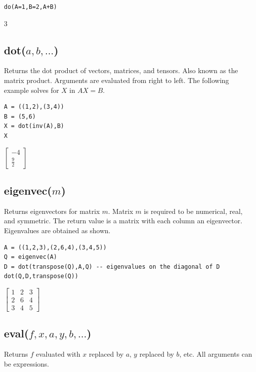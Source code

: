 \documentclass[12pt]{article}
\begin{document}
{\color{blue}
\begin{verbatim}
do(A=1,B=2,A+B)
\end{verbatim}
}

\noindent
$3$

\subsection*{dot($a,b,\ldots$)}

Returns the dot product of vectors, matrices, and tensors.
Also known as the matrix product.
Arguments are evaluated from right to left.
The following example solves for $X$ in $AX=B$.

{\color{blue}
\begin{verbatim}
A = ((1,2),(3,4))
B = (5,6)
X = dot(inv(A),B)
X
\end{verbatim}
}

\noindent
$\displaystyle
\begin{bmatrix}
-4
\\[1ex]
\tfrac{9}{2}
\end{bmatrix}
$

\subsection*{eigenvec($m$)}

Returns eigenvectors for matrix $m$.
Matrix $m$ is required to be numerical, real, and symmetric.
The return value is a matrix with each column an eigenvector.
Eigenvalues are obtained as shown.

{\color{blue}
\begin{verbatim}
A = ((1,2,3),(2,6,4),(3,4,5))
Q = eigenvec(A)
D = dot(transpose(Q),A,Q) -- eigenvalues on the diagonal of D
dot(Q,D,transpose(Q))
\end{verbatim}
}

\noindent
$\displaystyle
\begin{bmatrix}
1 & 2 & 3
\\[1ex]
2 & 6 & 4
\\[1ex]
3 & 4 & 5
\end{bmatrix}
$

\subsection*{eval($f,x,a,y,b,\ldots$)}

Returns $f$ evaluated with $x$ replaced by $a$, $y$ replaced by $b$, etc.
All arguments can be expressions.
\end{document}
